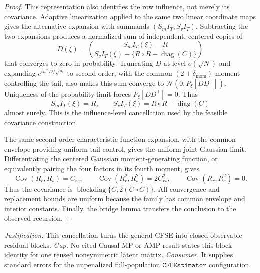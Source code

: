 \documentclass{article}
\begin{document}
\begin{proof}
This representation also identifies the row influence, not merely its covariance.  Adaptive linearization applied to the same two linear coordinate maps gives the alternative expansion with summands \((S_mI_T,S_vI_T)\).  Subtracting the two expansions produces a normalized sum of independent, centered copies of
\[
 D(\xi)=\binom{S_mI_T(\xi)-R}{S_vI_T(\xi)-\{R\circ R-\operatorname{diag}(C)\}}
\]
that converges to zero in probability.  Truncating \(D\) at level \(o(\sqrt N)\) and expanding \(e^{iu^{\top}D/\sqrt N}\) to second order, with the common \((2+\delta_{\mathrm{mom}})\)-moment controlling the tail, also makes this sum converge to \(\mathcal N(0,P_\xi[DD^{\top}])\).  Uniqueness of the probability limit forces \(P_\xi[DD^{\top}]=0\).  Thus
\[
 S_mI_T(\xi)=R,
 \qquad S_vI_T(\xi)=R\circ R-\operatorname{diag}(C)
\]
almost surely.  This is the influence-level cancellation used by the feasible covariance construction.

The same second-order characteristic-function expansion, with the common envelope providing uniform tail control, gives the uniform joint Gaussian limit.  Differentiating the centered Gaussian moment-generating function, or equivalently pairing the four factors in its fourth moment, gives
\[
 \operatorname{Cov}(R_r,R_s)=C_{rs},\qquad
 \operatorname{Cov}(R_r^2,R_s^2)=2C_{rs}^2,
 \qquad
 \operatorname{Cov}(R_r,R_s^2)=0.
\]
Thus the covariance is \(\operatorname{blockdiag}\{C,2(C\circ C)\}\).  All convergence and replacement bounds are uniform because the family has common envelope and interior constants.  Finally, the bridge lemma transfers the conclusion to the observed recursion.
\end{proof}
\par\smallskip\noindent \textit{Justification.} This cancellation turns the general CFSE into closed observable residual blocks. \textit{Gap.} No cited Causal-MP or AMP result states this block identity for one reused nonsymmetric latent matrix. \textit{Consumer.} It supplies standard errors for the unpenalized full-population \(\texttt{CFEEstimator}\) configuration.
\end{document}
